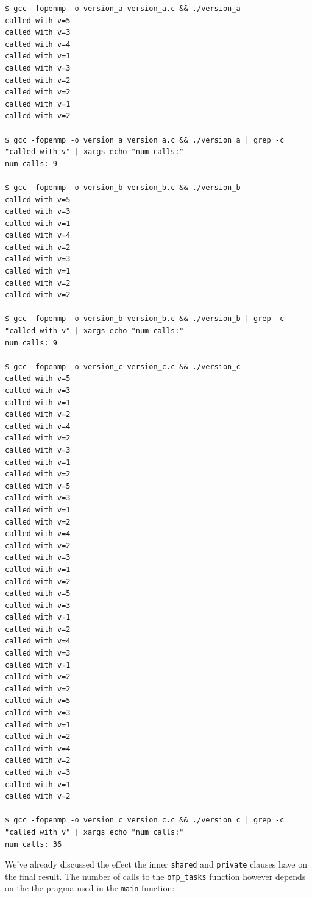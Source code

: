 \documentclass[a4paper,%
7pt,%
DIV12,
headsepline,%
headings=normal,
]{scrartcl}
\begin{document}
\begin{verbatim}
$ gcc -fopenmp -o version_a version_a.c && ./version_a
called with v=5
called with v=3
called with v=4
called with v=1
called with v=3
called with v=2
called with v=2
called with v=1
called with v=2

$ gcc -fopenmp -o version_a version_a.c && ./version_a | grep -c "called with v" | xargs echo "num calls:"
num calls: 9

$ gcc -fopenmp -o version_b version_b.c && ./version_b
called with v=5
called with v=3
called with v=1
called with v=4
called with v=2
called with v=3
called with v=1
called with v=2
called with v=2

$ gcc -fopenmp -o version_b version_b.c && ./version_b | grep -c "called with v" | xargs echo "num calls:"
num calls: 9

$ gcc -fopenmp -o version_c version_c.c && ./version_c
called with v=5
called with v=3
called with v=1
called with v=2
called with v=4
called with v=2
called with v=3
called with v=1
called with v=2
called with v=5
called with v=3
called with v=1
called with v=2
called with v=4
called with v=2
called with v=3
called with v=1
called with v=2
called with v=5
called with v=3
called with v=1
called with v=2
called with v=4
called with v=3
called with v=1
called with v=2
called with v=2
called with v=5
called with v=3
called with v=1
called with v=2
called with v=4
called with v=2
called with v=3
called with v=1
called with v=2

$ gcc -fopenmp -o version_c version_c.c && ./version_c | grep -c "called with v" | xargs echo "num calls:"
num calls: 36
\end{verbatim}

We've already discussed the effect the inner \texttt{shared} and \texttt{private} clauses have on the final result. The number of calls to the \texttt{omp\_tasks} function however depends on the the pragma used in the \texttt{main} function:
\end{document}
